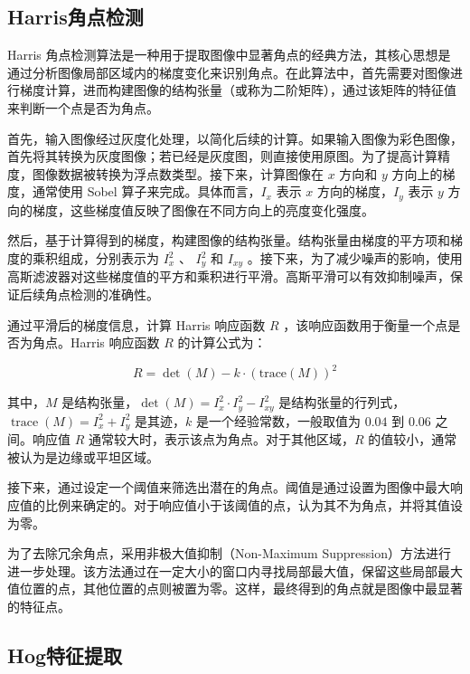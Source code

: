 \documentclass[a4paper, utf8]{ctexart}
\begin{document}
	\subsection{Harris角点检测}
	
	Harris 角点检测算法是一种用于提取图像中显著角点的经典方法，其核心思想是通过分析图像局部区域内的梯度变化来识别角点。在此算法中，首先需要对图像进行梯度计算，进而构建图像的结构张量（或称为二阶矩阵），通过该矩阵的特征值来判断一个点是否为角点。
	
	首先，输入图像经过灰度化处理，以简化后续的计算。如果输入图像为彩色图像，首先将其转换为灰度图像；若已经是灰度图，则直接使用原图。为了提高计算精度，图像数据被转换为浮点数类型。接下来，计算图像在 $x$ 方向和 $y$ 方向上的梯度，通常使用 Sobel 算子来完成。具体而言，$I_x$ 表示 $x$ 方向的梯度，$I_y$ 表示 $y$ 方向的梯度，这些梯度值反映了图像在不同方向上的亮度变化强度。
	
	然后，基于计算得到的梯度，构建图像的结构张量。结构张量由梯度的平方项和梯度的乘积组成，分别表示为 $I_x^2$ 、 $I_y^2$ 和 $I_{xy}$ 。接下来，为了减少噪声的影响，使用高斯滤波器对这些梯度值的平方和乘积进行平滑。高斯平滑可以有效抑制噪声，保证后续角点检测的准确性。
	
	通过平滑后的梯度信息，计算 Harris 响应函数 $R$ ，该响应函数用于衡量一个点是否为角点。Harris 响应函数 $R$ 的计算公式为：
	
	\vspace{-.5em}
	\begin{equation}
		R = \det(M) - k \cdot (\text{trace}(M))^2
	\end{equation}
	 
	其中，$M$ 是结构张量，$\det(M) = I_x^2 \cdot I_y^2 - I_{xy}^2$ 是结构张量的行列式，$\operatorname{trace}(M) = I_x^2 + I_y^2$ 是其迹，$k$ 是一个经验常数，一般取值为 $0.04$ 到 $0.06$ 之间。响应值 $R$ 通常较大时，表示该点为角点。对于其他区域，$R$ 的值较小，通常被认为是边缘或平坦区域。
	
	接下来，通过设定一个阈值来筛选出潜在的角点。阈值是通过设置为图像中最大响应值的比例来确定的。对于响应值小于该阈值的点，认为其不为角点，并将其值设为零。
	
	为了去除冗余角点，采用非极大值抑制（Non-Maximum Suppression）方法进行进一步处理。该方法通过在一定大小的窗口内寻找局部最大值，保留这些局部最大值位置的点，其他位置的点则被置为零。这样，最终得到的角点就是图像中最显著的特征点。
	
	\subsection{Hog特征提取}
	
\end{document}
